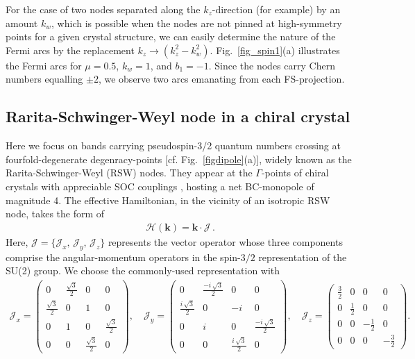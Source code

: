 \documentclass[aps,prb,onecolumn, footinbib, 10pt]{revtex4-2}
\begin{document}
For the case of two nodes separated along the $ k_z$-direction (for example) by an amount $k_w$, which is possible when the nodes are not pinned at high-symmetry points for a given crystal structure, we can easily determine the nature of the Fermi arcs by the replacement $ k_z \rightarrow (k_z^2 - k_w^2)$. Fig.~\ref{fig_spin1}(a) illustrates the Fermi arcs for $\mu=0.5$, $k_w =1$, and $b_1=-1$. Since the nodes carry Chern numbers equalling $\pm 2$, we observe two arcs emanating from each FS-projection.


\subsection{Rarita-Schwinger-Weyl node in a chiral crystal}

Here we focus on bands carrying pseudospin-3/2 quantum numbers crossing at fourfold-degenerate degenracy-points [cf. Fig.~\ref{figdipole}(a)], widely known as the Rarita-Schwinger-Weyl (RSW) nodes. They appear at the $\Gamma$-points of chiral crystals with appreciable SOC couplings \cite{grushin-multifold, multifold-rhsi, Yao2020, ips-rsw-ph,*ips-shreya,*ips-internode}, hosting a net BC-monopole of magnitude 4. The effective Hamiltonian, in the vicinity of an isotropic RSW node, takes the form of
\begin{align}
\mathcal{H}(\boldsymbol{k}) =   {\mathbf k} \cdot \boldsymbol{\mathcal J} \,.
\end{align}
Here, $ \boldsymbol{\mathcal J } = \lbrace {\mathcal J }_x,\, {\mathcal J }_y,\, {\mathcal J }_z \rbrace $ represents the vector operator whose three components comprise the angular-momentum operators in the spin-$3/2$ representation of the SU(2) group. We choose the commonly-used representation with
\begin{align}
{\mathcal J }_x= 
\begin{pmatrix}
	0 & \frac{\sqrt{3}}{2} & 0 & 0 \\
	\frac{\sqrt{3}}{2} & 0 & 1 & 0 \\
	0 & 1 & 0 & \frac{\sqrt{3}}{2} \\
	0 & 0 & \frac{\sqrt{3}}{2} & 0 
\end{pmatrix} , \quad
{\mathcal J }_y=
\begin{pmatrix}
	0 & \frac{-i \,  \sqrt{3}}{2}  & 0 & 0 \\
	\frac{i \, \sqrt{3}}{2} & 0 & -i & 0 \\
	0 & i & 0 & \frac{-i \, \sqrt{3}}{2}  \\
	0 & 0 & \frac{i \, \sqrt{3}}{2} & 0 
\end{pmatrix}, \quad
{\mathcal J }_z =
\begin{pmatrix}
	\frac{3}{2} & 0 & 0 & 0 \\
	0 & \frac{1}{2} & 0 & 0 \\
	0 & 0 & -\frac{1}{2} & 0 \\
	0 & 0 & 0 & -\frac{3}{2} 
\end{pmatrix}.
\end{align}
\end{document}
